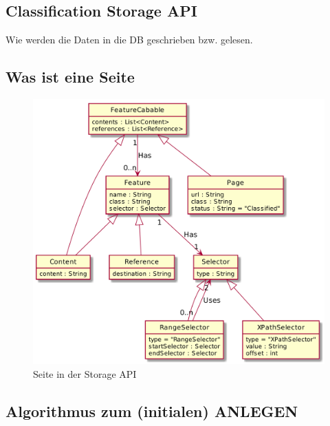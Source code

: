     \subsection{Classification Storage API}
        Wie werden die Daten in die DB geschrieben bzw. gelesen.

    \subsection{Was ist eine Seite}
        \begin{figure}
            \centering
            \includegraphics[width=\textwidth]{../resources/storage-api-data-model/page.png}
            \caption{Seite in der Storage API}
            \label{image:storageApiPageModel}
        \end{figure}

    \subsection{Algorithmus zum (initialen) ANLEGEN}
        